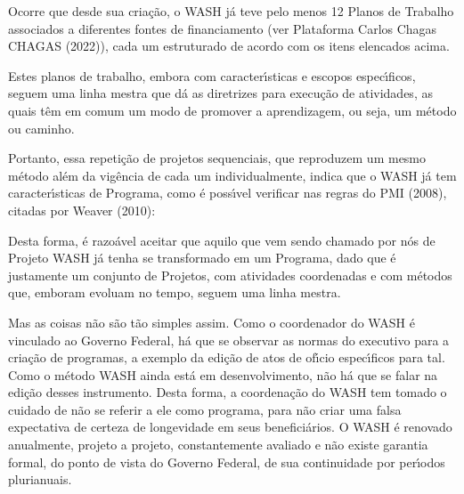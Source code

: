 \documentclass[
12pt,		%
openright,	%
twoside,  %
a4paper,			%
chapter=TITLE,		%
english,			%
french,				%
spanish,			%
brazil				%
]{USPSC-classe/USPSC}
\begin{document}
Ocorre que desde sua cria\c{c}\~ao, o WASH j\'a teve pelo menos 12 Planos de Trabalho associados a diferentes fontes de financiamento (ver Plataforma Carlos Chagas CHAGAS (2022)), cada um estruturado de acordo com os itens elencados acima.




Estes planos de trabalho, embora com caracter\'{\i}sticas e escopos espec\'{\i}ficos, seguem uma linha mestra que d\'a as diretrizes para execu\c{c}\~ao de atividades, as quais t\^em em comum um modo de promover a aprendizagem, ou seja, um m\'etodo ou \textquotedbl caminho\textquotedbl .




Portanto, essa repeti\c{c}\~ao de projetos sequenciais, que reproduzem um mesmo m\'etodo al\'em da vig\^encia de cada um individualmente, indica que o WASH j\'a tem caracter\'{\i}sticas de Programa, como \'e poss\'{\i}vel verificar nas regras do  PMI (2008), citadas por  Weaver (2010):





\noindent\begin{center}\mbox{\centering{}}\end{center}


Desta forma, \'e razo\'avel aceitar que aquilo que vem sendo chamado por n\'os de Projeto WASH j\'a tenha se transformado em um Programa, dado que \'e justamente um conjunto de Projetos, com atividades coordenadas e com m\'etodos que, emboram evoluam no tempo, seguem uma linha mestra.




Mas as coisas n\~ao s\~ao t\~ao simples assim. Como o coordenador do WASH \'e vinculado ao Governo Federal, h\'a que se observar as normas do executivo para a cria\c{c}\~ao de programas, a exemplo da edi\c{c}\~ao de atos de of\'{\i}cio espec\'{\i}ficos para tal. Como o m\'etodo WASH ainda est\'a em desenvolvimento, n\~ao h\'a que se falar na edi\c{c}\~ao desses instrumento. Desta forma, a coordena\c{c}\~ao do WASH tem tomado o cuidado de n\~ao se referir a ele como programa, para n\~ao criar uma falsa expectativa de certeza de longevidade em seus benefici\'arios. O WASH \'e renovado anualmente, projeto a projeto, constantemente avaliado e n\~ao existe garantia formal, do ponto de vista do Governo Federal, de sua continuidade por per\'{\i}odos plurianuais.
\end{document}
